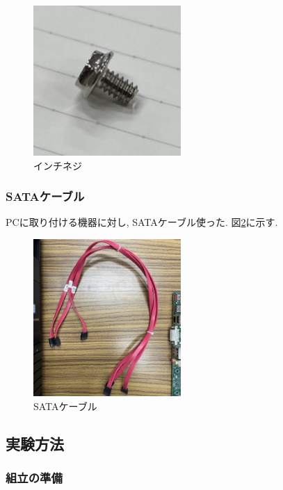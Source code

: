 \documentclass{ltjsarticle} %
\begin{document}
\begin{figure}[H] %
  \centering
  \includegraphics[width=0.5\textwidth]{neji2.jpg} %
  \caption{インチネジ} %
  \label{fig:neji2} %
\end{figure}


\subsubsection{SATAケーブル}
PCに取り付ける機器に対し, SATAケーブル使った. 図\ref{fig:SATA}に示す. 

\begin{figure}[H] %
  \centering
  \includegraphics[width=0.5\textwidth]{SATA.jpg} %
  \caption{SATAケーブル} %
  \label{fig:SATA} %
\end{figure}


\subsection{実験方法}

\subsubsection{組⽴の準備}
\end{document}
